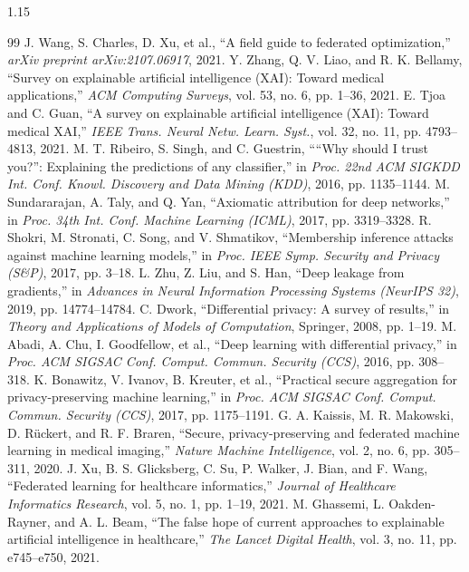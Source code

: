 \documentclass[12pt,a4paper,oneside]{report}
\begin{document}
\begin{spacing}{1.15}
\begin{thebibliography}{99}
     J. Wang, S. Charles, D. Xu, et al., ``A field guide to federated optimization,'' \textit{arXiv preprint arXiv:2107.06917}, 2021.
     Y. Zhang, Q. V. Liao, and R. K. Bellamy, ``Survey on explainable artificial intelligence (XAI): Toward medical applications,'' \textit{ACM Computing Surveys}, vol. 53, no. 6, pp. 1--36, 2021.
     E. Tjoa and C. Guan, ``A survey on explainable artificial intelligence (XAI): Toward medical XAI,'' \textit{IEEE Trans. Neural Netw. Learn. Syst.}, vol. 32, no. 11, pp. 4793--4813, 2021.
     M. T. Ribeiro, S. Singh, and C. Guestrin, ````Why should I trust you?'': Explaining the predictions of any classifier,'' in \textit{Proc. 22nd ACM SIGKDD Int. Conf. Knowl. Discovery and Data Mining (KDD)}, 2016, pp. 1135--1144.
     M. Sundararajan, A. Taly, and Q. Yan, ``Axiomatic attribution for deep networks,'' in \textit{Proc. 34th Int. Conf. Machine Learning (ICML)}, 2017, pp. 3319--3328.
     R. Shokri, M. Stronati, C. Song, and V. Shmatikov, ``Membership inference attacks against machine learning models,'' in \textit{Proc. IEEE Symp. Security and Privacy (S\&P)}, 2017, pp. 3--18.
     L. Zhu, Z. Liu, and S. Han, ``Deep leakage from gradients,'' in \textit{Advances in Neural Information Processing Systems (NeurIPS 32)}, 2019, pp. 14774--14784.
     C. Dwork, ``Differential privacy: A survey of results,'' in \textit{Theory and Applications of Models of Computation}, Springer, 2008, pp. 1--19.
     M. Abadi, A. Chu, I. Goodfellow, et al., ``Deep learning with differential privacy,'' in \textit{Proc. ACM SIGSAC Conf. Comput. Commun. Security (CCS)}, 2016, pp. 308--318.
     K. Bonawitz, V. Ivanov, B. Kreuter, et al., ``Practical secure aggregation for privacy-preserving machine learning,'' in \textit{Proc. ACM SIGSAC Conf. Comput. Commun. Security (CCS)}, 2017, pp. 1175--1191.
     G. A. Kaissis, M. R. Makowski, D. Rückert, and R. F. Braren, ``Secure, privacy-preserving and federated machine learning in medical imaging,'' \textit{Nature Machine Intelligence}, vol. 2, no. 6, pp. 305--311, 2020.
     J. Xu, B. S. Glicksberg, C. Su, P. Walker, J. Bian, and F. Wang, ``Federated learning for healthcare informatics,'' \textit{Journal of Healthcare Informatics Research}, vol. 5, no. 1, pp. 1--19, 2021.
     M. Ghassemi, L. Oakden-Rayner, and A. L. Beam, ``The false hope of current approaches to explainable artificial intelligence in healthcare,'' \textit{The Lancet Digital Health}, vol. 3, no. 11, pp. e745--e750, 2021.
\end{thebibliography}
\end{spacing}
\end{document}

